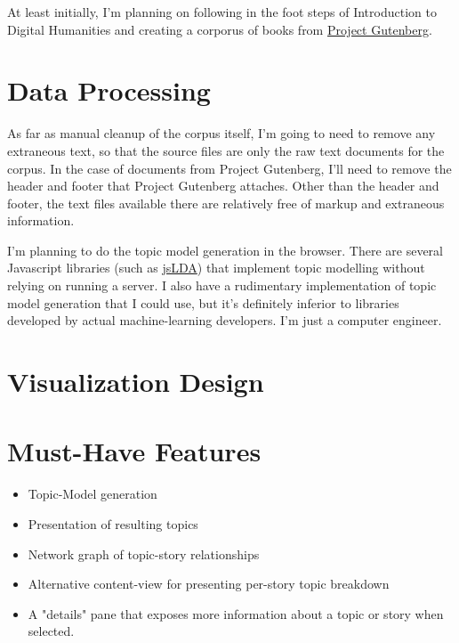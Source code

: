 At least initially, I'm planning on following in the foot steps of
Introduction to Digital Humanities and creating a corporus of books from
\href{https://www.gutenberg.org/}{Project Gutenberg}.

\section{Data Processing}
As far as manual cleanup of the corpus itself, I'm going to need to
remove any extraneous text, so that the source files are only the raw
text documents for the corpus.  In the case of documents from Project
Gutenberg, I'll need to remove the header and footer that Project
Gutenberg attaches. Other than the header and footer, the text files
available there are relatively free of markup and extraneous
information.

I'm planning to do the topic model generation in the browser.  There are
several Javascript libraries (such as
\href{https://mimno.infosci.cornell.edu/jsLDA/}{jsLDA}) that implement
topic modelling without relying on running a server.  I also have a
rudimentary implementation of topic model generation that I could use,
but it's definitely inferior to libraries developed by actual
machine-learning developers.  I'm just a computer engineer.

\section{Visualization Design}


\section{Must-Have Features}
\begin{itemize}
	\item Topic-Model generation
	\item Presentation of resulting topics
	\item Network graph of topic-story relationships
	\item Alternative content-view for presenting per-story topic 
		breakdown
	\item A "details" pane that exposes more information about a topic or
		story when selected.
\end{itemize}

